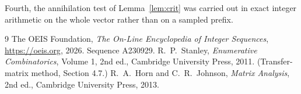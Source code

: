 \documentclass[11pt,a4paper]{article}
\theoremstyle{plain}
\theoremstyle{definition}
\begin{document}
Fourth, the annihilation test of Lemma~\ref{lem:crit} was carried out in exact integer
arithmetic on the whole vector rather than on a sampled prefix.

\begin{thebibliography}{9}
 The OEIS Foundation, \emph{The On-Line Encyclopedia of Integer
Sequences}, \url{https://oeis.org}, 2026. Sequence A230929.
 R.~P.~Stanley, \emph{Enumerative Combinatorics}, Volume 1, 2nd ed.,
Cambridge University Press, 2011. (Transfer-matrix method, Section 4.7.)
 R.~A.~Horn and C.~R.~Johnson, \emph{Matrix Analysis}, 2nd ed., Cambridge
University Press, 2013.
\end{thebibliography}
\end{document}
